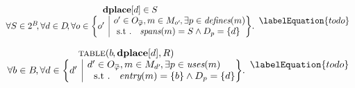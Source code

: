 

\begin{equation}
  \begin{array}{c}
    \mVar{dplace}[d] \in S \\
    \forall S \in \mPowerset{\mBlockSet} \hspace{-2pt},
    \forall d \in \mDataSet \!,
    \forall o \in
      \mSetBuilder*{o'}%
                   {%
                     \begin{array}{@{}l@{}}
                       o' \in \mOpCompSet{\mPhi},
                       m \in \mMatchSet[o'] \hspace{-1pt},
                       \exists p \in \mDefines(m) \\
                       \text{\st }
                       \mSpans(m) = S \mAnd \mDataSet[p] = \mSet{d}
                     \end{array}
                   } \!.
  \end{array}
  \labelEquation{todo}
\end{equation}



\begin{equation}
  \begin{array}{c}
    \mTable(b \hspace{-.8pt}, \mVar{dplace}[d], \mDomMatrix) \\
    \forall b \in \mBlockSet \hspace{-1pt},
    \forall d \in
      \mSetBuilder*{d'}%
                   {%
                     \begin{array}{@{}l@{}}
                       d' \in \mOpCompSet{\mPhi},
                       m \in \mMatchSet[d'] \hspace{-1pt},
                       \exists p \in \mUses(m) \\
                       \text{ \st}
                       \mEntry(m) = \mSet{b} \mAnd \mDataSet[p] = \mSet{d}
                     \end{array}
                   } \!.
  \end{array}
  \labelEquation{todo}
\end{equation}

